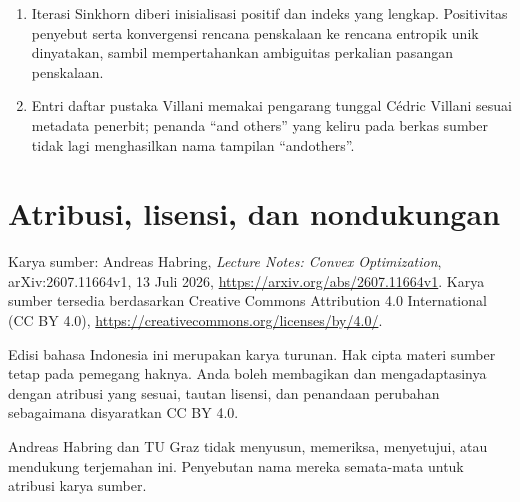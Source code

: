 \documentclass[indonesian]{shinybook}
\begin{document}
\begin{enumerate}
    \item Iterasi Sinkhorn diberi inisialisasi positif dan indeks yang lengkap. Positivitas penyebut serta konvergensi rencana penskalaan ke rencana entropik unik dinyatakan, sambil mempertahankan ambiguitas perkalian pasangan penskalaan.
    \item Entri daftar pustaka Villani memakai pengarang tunggal C\'edric Villani sesuai metadata penerbit; penanda ``and others'' yang keliru pada berkas sumber tidak lagi menghasilkan nama tampilan ``andothers''.
\end{enumerate}

\chapter*{Atribusi, lisensi, dan nondukungan}
Karya sumber: Andreas Habring, \emph{Lecture Notes: Convex Optimization}, arXiv:2607.11664v1, 13 Juli 2026, \url{https://arxiv.org/abs/2607.11664v1}. Karya sumber tersedia berdasarkan Creative Commons Attribution 4.0 International (CC BY 4.0), \url{https://creativecommons.org/licenses/by/4.0/}.

Edisi bahasa Indonesia ini merupakan karya turunan. Hak cipta materi sumber tetap pada pemegang haknya. Anda boleh membagikan dan mengadaptasinya dengan atribusi yang sesuai, tautan lisensi, dan penandaan perubahan sebagaimana disyaratkan CC BY 4.0.

Andreas Habring dan TU Graz tidak menyusun, memeriksa, menyetujui, atau mendukung terjemahan ini. Penyebutan nama mereka semata-mata untuk atribusi karya sumber.
\end{document}
